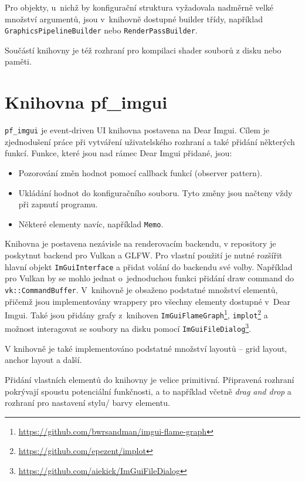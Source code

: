 Pro objekty, u~nichž by konfigurační struktura vyžadovala nadměrně velké množství argumentů, jsou v~knihovně dostupné builder třídy, například \texttt{GraphicsPipelineBuilder} nebo \texttt{RenderPassBuilder}.

Součástí knihovny je též rozhraní pro kompilaci shader souborů z disku nebo paměti.



\section{Knihovna pf\_imgui}\label{sec:pf_imgui}
\texttt{pf\_imgui} je event-driven UI knihovna postavena na Dear Imgui. Cílem je zjednodušení práce při vytváření uživatelského rozhraní a také přidání některých funkcí. Funkce, které jsou nad rámec Dear Imgui přidané, jsou:

\begin{itemize}
	\item Pozorování změn hodnot pomocí callback funkcí (observer pattern).
	\item Ukládání hodnot do konfiguračního souboru. Tyto změny jsou načteny vždy při zapnutí programu.
	\item Některé elementy navíc, například \texttt{Memo}.
\end{itemize}

Knihovna je postavena nezávisle na renderovacím backendu, v repository je poskytnut backend pro Vulkan a GLFW. Pro vlastní použití je nutné rozšířit hlavní objekt \texttt{ImGuiInterface} a přidat volání do backendu své volby. Například pro Vulkan by se mohlo jednat o~jednoduchou funkci přidání draw command do \texttt{vk::CommandBuffer}. V~knihovně je obsaženo podstatné množství elementů, přičemž jsou implementovány wrappery pro všechny elementy dostupné v~Dear Imgui. Také jsou přidány grafy z~knihoven \texttt{ImGuiFlameGraph}\footnote{\url{https://github.com/bwrsandman/imgui-flame-graph}}, \texttt{implot}\footnote{\url{https://github.com/epezent/implot}} a možnost interagovat se soubory na disku pomocí \texttt{ImGuiFileDialog}\footnote{\url{https://github.com/aiekick/ImGuiFileDialog}}.

V knihovně je také implementováno podstatné množství layoutů -- grid layout, anchor layout a další.

Přidání vlastních elementů do knihovny je velice primitivní. Připravená rozhraní pokrývají spoustu potenciální funkčnosti, a to například včetně \textit{drag and drop} a rozhraní pro nastavení stylu/ barvy elementu. 

